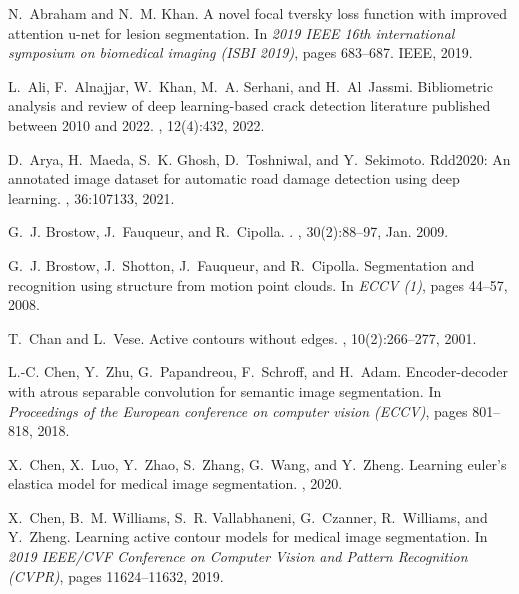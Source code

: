 \documentclass[twocolumn]{article}
\begin{document}

\begin{thebibliography}{10}

N.~Abraham and N.~M. Khan.
\newblock A novel focal tversky loss function with improved attention u-net for
  lesion segmentation.
\newblock In {\em 2019 IEEE 16th international symposium on biomedical imaging
  (ISBI 2019)}, pages 683--687. IEEE, 2019.

L.~Ali, F.~Alnajjar, W.~Khan, M.~A. Serhani, and H.~Al~Jassmi.
\newblock Bibliometric analysis and review of deep learning-based crack
  detection literature published between 2010 and 2022.
, 12(4):432, 2022.

D.~Arya, H.~Maeda, S.~K. Ghosh, D.~Toshniwal, and Y.~Sekimoto.
\newblock Rdd2020: An annotated image dataset for automatic road damage
  detection using deep learning.
, 36:107133, 2021.

G.~J. {Brostow}, J.~{Fauqueur}, and R.~{Cipolla}.
.
, 30(2):88--97, Jan. 2009.

G.~J. Brostow, J.~Shotton, J.~Fauqueur, and R.~Cipolla.
\newblock Segmentation and recognition using structure from motion point
  clouds.
\newblock In {\em ECCV (1)}, pages 44--57, 2008.

T.~Chan and L.~Vese.
\newblock Active contours without edges.
, 10(2):266--277, 2001.

L.-C. Chen, Y.~Zhu, G.~Papandreou, F.~Schroff, and H.~Adam.
\newblock Encoder-decoder with atrous separable convolution for semantic image
  segmentation.
\newblock In {\em Proceedings of the European conference on computer vision
  (ECCV)}, pages 801--818, 2018.

X.~Chen, X.~Luo, Y.~Zhao, S.~Zhang, G.~Wang, and Y.~Zheng.
\newblock Learning euler's elastica model for medical image segmentation.
, 2020.

X.~Chen, B.~M. Williams, S.~R. Vallabhaneni, G.~Czanner, R.~Williams, and
  Y.~Zheng.
\newblock Learning active contour models for medical image segmentation.
\newblock In {\em 2019 IEEE/CVF Conference on Computer Vision and Pattern
  Recognition (CVPR)}, pages 11624--11632, 2019.


\end{thebibliography}
\end{document}
